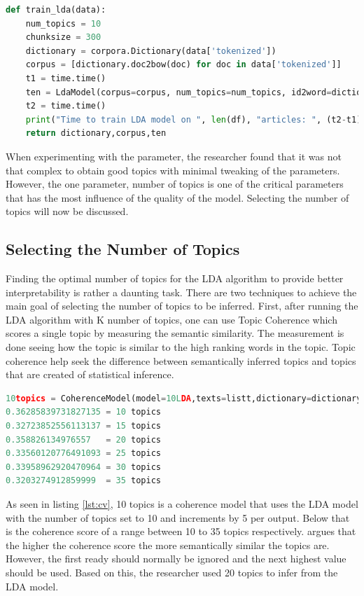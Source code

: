 \begin{lstlisting}[language=Python, label={lst:lda}, caption=LDA Parameters]
def train_lda(data):
    num_topics = 10
    chunksize = 300
    dictionary = corpora.Dictionary(data['tokenized'])
    corpus = [dictionary.doc2bow(doc) for doc in data['tokenized']]
    t1 = time.time()
    ten = LdaModel(corpus=corpus, num_topics=num_topics, id2word=dictionary, chunksize=chunksize, minimum_probability=0.0,iterations=100)
    t2 = time.time()
    print("Time to train LDA model on ", len(df), "articles: ", (t2-t1)/60, "min")
    return dictionary,corpus,ten
\end{lstlisting}
When experimenting with the parameter, the researcher found that it was not that complex to obtain good topics with minimal tweaking of the parameters. However, the one parameter, number of topics is one of the critical parameters that has the most influence of the quality of the model. Selecting the number of topics will now be discussed.

\subsection{Selecting the Number of Topics} \label{ssc:lekker}
Finding the optimal number of topics for the LDA algorithm to provide better interpretability is rather a daunting task. There are two techniques to achieve the main goal of selecting the number of topics to be inferred.
First, after running the LDA algorithm with K number of topics, one can use Topic Coherence which scores a single topic by measuring the semantic similarity. The measurement is done seeing how the topic is similar to the high ranking words in the topic. Topic coherence help seek the difference between semantically inferred topics and topics that are created of statistical inference. 

\begin{lstlisting}[language=Python, label={lst:cv}, caption=Topic coherence]
10topics = CoherenceModel(model=10LDA,texts=listt,dictionary=dictionary,coherence='c_v')
0.36285839731827135 = 10 topics
0.32723852556113137 = 15 topics
0.358826134976557   = 20 topics
0.33560120776491093 = 25 topics
0.33958962920470964 = 30 topics
0.3203274912859999  = 35 topics
\end{lstlisting}
As seen in listing \ref{lst:cv}, 10 topics is a coherence model that uses the LDA model with the number of topics set to 10 and increments by 5 per output. Below that is the coherence score of a range between 10 to 35 topics respectively. \cite{stevens-etal-2012-exploring} argues that the higher the coherence score the more semantically similar the topics are. However, the first ready should normally be ignored and the next highest value should be used. Based on this, the researcher used 20 topics to infer from the LDA model.

